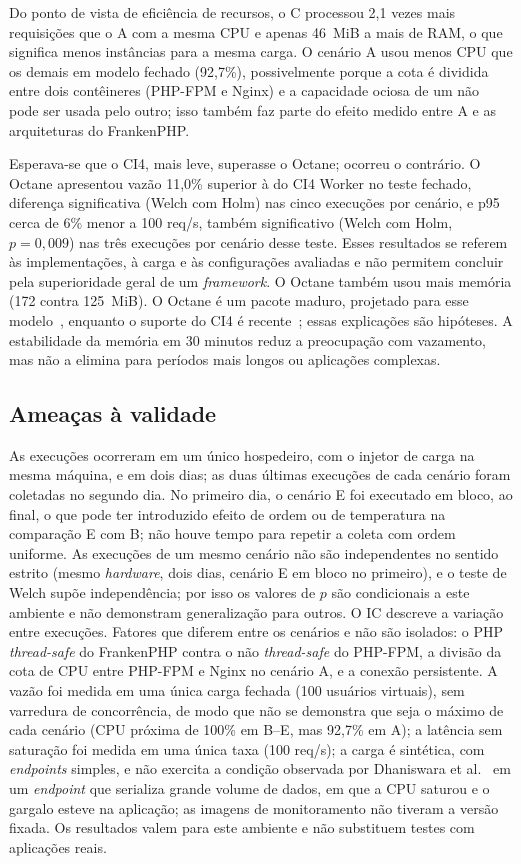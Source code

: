 \documentclass[sigconf, nonacm, screen, anonymous, language=portuguese, language=spanish, language={main=english}]{acmart}
\begin{document}
Do ponto de vista de eficiência de recursos, o C processou 2,1 vezes mais requisições que o A com a mesma CPU e apenas 46~MiB a mais de RAM, o que significa menos instâncias para a mesma carga. O cenário A usou menos CPU que os demais em modelo fechado (92,7\%), possivelmente porque a cota é dividida entre dois contêineres (PHP-FPM e Nginx) e a capacidade ociosa de um não pode ser usada pelo outro; isso também faz parte do efeito medido entre A e as arquiteturas do FrankenPHP.

Esperava-se que o CI4, mais leve, superasse o Octane; ocorreu o contrário. O Octane apresentou vazão 11,0\% superior à do CI4 Worker no teste fechado, diferença significativa (Welch com Holm) nas cinco execuções por cenário, e p95 cerca de 6\% menor a 100 req/s, também significativo (Welch com Holm, $p=0{,}009$) nas três execuções por cenário desse teste. Esses resultados se referem às implementações, à carga e às configurações avaliadas e não permitem concluir pela superioridade geral de um \textit{framework}. O Octane também usou mais memória (172 contra 125~MiB). O Octane é um pacote maduro, projetado para esse modelo~\cite{otwell2024}, enquanto o suporte do CI4 é recente~\cite{codeigniter2024}; essas explicações são hipóteses. A estabilidade da memória em 30 minutos reduz a preocupação com vazamento, mas não a elimina para períodos mais longos ou aplicações complexas.

\subsection{Ameaças à validade}
As execuções ocorreram em um único hospedeiro, com o injetor de carga na mesma máquina, e em dois dias; as duas últimas execuções de cada cenário foram coletadas no segundo dia. No primeiro dia, o cenário E foi executado em bloco, ao final, o que pode ter introduzido efeito de ordem ou de temperatura na comparação E com B; não houve tempo para repetir a coleta com ordem uniforme. As execuções de um mesmo cenário não são independentes no sentido estrito (mesmo \textit{hardware}, dois dias, cenário E em bloco no primeiro), e o teste de Welch supõe independência; por isso os valores de $p$ são condicionais a este ambiente e não demonstram generalização para outros. O IC descreve a variação entre execuções. Fatores que diferem entre os cenários e não são isolados: o PHP \textit{thread-safe} do FrankenPHP contra o não \textit{thread-safe} do PHP-FPM, a divisão da cota de CPU entre PHP-FPM e Nginx no cenário A, e a conexão persistente. A vazão foi medida em uma única carga fechada (100 usuários virtuais), sem varredura de concorrência, de modo que não se demonstra que seja o máximo de cada cenário (CPU próxima de 100\% em B--E, mas 92,7\% em A); a latência sem saturação foi medida em uma única taxa (100 req/s); a carga é sintética, com \textit{endpoints} simples, e não exercita a condição observada por Dhaniswara et al.~\cite{dhaniswara2025} em um \textit{endpoint} que serializa grande volume de dados, em que a CPU saturou e o gargalo esteve na aplicação; as imagens de monitoramento não tiveram a versão fixada. Os resultados valem para este ambiente e não substituem testes com aplicações reais.
\end{document}
